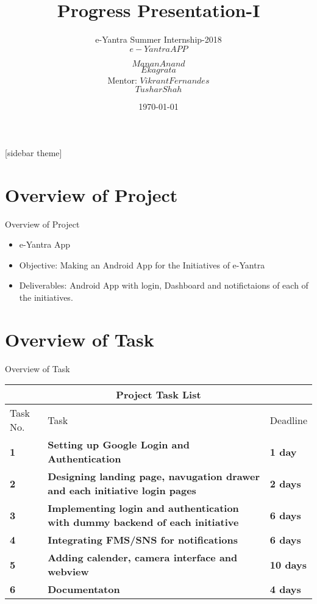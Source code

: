 \documentclass[10pt, a4paper]{beamer}
\begin{document}
	\title{Progress Presentation-I}
	\subtitle{e-Yantra Summer Internship-2018 \\ $e-Yantra APP$}
	\author{$Manan Anand$\\$Ekagrata$\\
	Mentor: $Vikrant Fernandes$\\$Tushar Shah$}
	\date{\today}
	
	\frame{\titlepage}

[sidebar theme]
\section{Overview of Project}
\begin{frame}{Overview of Project}
	
	\begin{itemize}
		\item e-Yantra App
		\item Objective: Making an Android App for the Initiatives of e-Yantra 
		\item Deliverables: Android App with login, Dashboard and notifictaions of each of the initiatives.
	\end{itemize}
\end{frame}

\section{Overview of Task}
\begin{frame}{Overview of Task}
		



\begin{center}

\begin{tabular}{ |p{1cm}||p{6.8cm}|p{1.3cm}| }
 \hline
 \multicolumn{3}{|c|}{Project Task List} \\
 \hline
 Task No. & \centering Task & Deadline\\
 \hline
 \textbf{1}& \textbf{Setting up Google Login and Authentication}  & \textbf{1 day}\\
 \hline
 \textbf{2}&   \textbf{Designing landing page, navugation drawer and each initiative login pages} & \textbf{2 days} \\
 \hline
 \textbf{3} & \textbf{Implementing login and authentication with dummy backend of each initiative} & \textbf{6 days}\\
 \hline
 \textbf{4} & \textbf{Integrating FMS/SNS for notifications} & \textbf{6 days}\\
 \hline
\textbf{ 5} &  \textbf{Adding calender, camera interface and webview}  & \textbf{10 days}\\
 \hline
\textbf{ 6} & \textbf{Documentaton}  & \textbf{ 4 days}  \\

 \hline
\end{tabular}
 
\end{center}

\end{frame}
\end{document}
